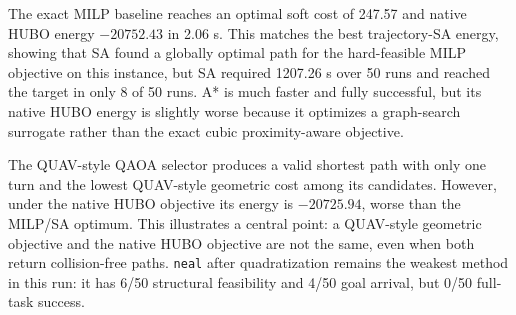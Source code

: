 \documentclass[10pt,conference]{IEEEtran}
\begin{document}
\begin{table}[t]
\centering
\scriptsize
\caption{Unified same-platform comparison. For deterministic or single-output methods, feasibility columns indicate whether the returned path satisfies the condition. For stochastic solvers, feasibility columns report empirical rates over 50 runs/reads.}
\label{tab:unified}
\end{table}


The exact MILP baseline reaches an optimal soft cost of 247.57 and native HUBO energy $-20752.43$ in 2.06 s. This matches the best trajectory-SA energy, showing that SA found a globally optimal path for the hard-feasible MILP objective on this instance, but SA required 1207.26 s over 50 runs and reached the target in only 8 of 50 runs. A* is much faster and fully successful, but its native HUBO energy is slightly worse because it optimizes a graph-search surrogate rather than the exact cubic proximity-aware objective.

The QUAV-style QAOA selector produces a valid shortest path with only one turn and the lowest QUAV-style geometric cost among its candidates. However, under the native HUBO objective its energy is $-20725.94$, worse than the MILP/SA optimum. This illustrates a central point: a QUAV-style geometric objective and the native HUBO objective are not the same, even when both return collision-free paths. \texttt{neal} after quadratization remains the weakest method in this run: it has 6/50 structural feasibility and 4/50 goal arrival, but 0/50 full-task success.
\end{document}
